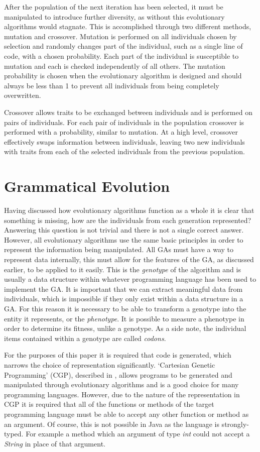\documentclass[a4paper, 12pt]{article}
\begin{document}
After the population of the next iteration has been selected, it must be manipulated to introduce further diversity, as without this evolutionary algorithms would stagnate. This is accomplished through two different methods, mutation and crossover. Mutation is performed on all individuals chosen by selection and randomly changes part of the individual, such as a single line of code, with a chosen probability. Each part of the individual is susceptible to mutation and each is checked independently of all others. The mutation probability is chosen when the evolutionary algorithm is designed and should always be less than 1 to prevent all individuals from being completely overwritten.

Crossover allows traits to be exchanged between individuals and is performed on pairs of individuals. For each pair of individuals in the population crossover is performed with a probability, similar to mutation. At a high level, crossover effectively swaps information between individuals, leaving two new individuals with traits from each of the selected individuals from the previous population.

\section{Grammatical Evolution}

Having discussed how evolutionary algorithms function as a whole it is clear that something is missing, how are the individuals from each generation represented? Answering this question is not trivial and there is not a single correct answer. However, all evolutionary algorithms use the same basic principles in order to represent the information being manipulated. All GAs must have a way to represent data internally, this must allow for the features of the GA, as discussed earlier, to be applied to it easily. This is the \textit{genotype} of the algorithm and is usually a data structure within whatever programming language has been used to implement the GA.  It is important that we can extract meaningful data from individuals, which is impossible if they only exist within a data structure in a GA. For this reason it is necessary to be able to transform a genotype into the entity it represents, or the \textit{phenotype}. It is possible to measure a phenotype in order to determine its fitness, unlike a genotype. As a side note, the individual items contained within a genotype are called \textit{codons}.

For the purposes of this paper it is required that code is generated, which narrows the choice of representation significantly. `Cartesian Genetic Programming' (CGP), described in \cite{miller_cartesian_2000}, allows programs to be generated and manipulated through evolutionary algorithms and is a good choice for many programming languages. However, due to the nature of the representation in CGP it is required that all of the functions or methods of the target programming language must be able to accept any other function or method as an argument. Of course, this is not possible in Java as the language is strongly-typed. For example a method which an argument of type \textit{int} could not accept a \textit{String} in place of that argument.
\end{document}
